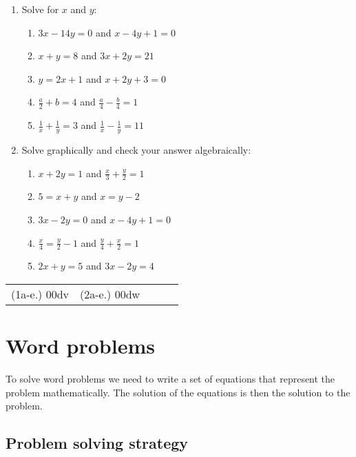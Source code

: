 \begin{exercises}{}
{
\begin{enumerate}[noitemsep, label=\textbf{\arabic*}. ] 
\item Solve for $x$ and $y$: 
\begin{enumerate}[noitemsep, label=\textbf{(\alph*)} ] 
\item $3x-14y=0$ and $x-4y+1=0$
\item $x+y=8$ and $3x + 2y = 21$
\item $y=2x+1$ and $x + 2y + 3 = 0$
\item $\frac{a}{2}+b=4$ and $\frac{a}{4} -\frac{b}{4}=1$
\item $\frac{1}{x}+\frac{1}{y}=3$ and $\frac{1}{x}-\frac{1}{y}=11$
\end{enumerate}

\item Solve graphically and check your answer algebraically:
\begin{enumerate}[noitemsep, label=\textbf{(\alph*)} ] 
\item  $x+2y=1$ and $\frac{x}{3} + \frac{y}{2} = 1$
\item $5= x+y$ and $x = y-2$
\item $3x - 2y = 0$ and $x - 4y + 1 = 0$
\item $\frac{x}{4}=\frac{y}{2}-1$  and $\frac{y}{4}+\frac{x}{2}=1$
\item $2x+y=5$ and $3x-2y=4$
\end{enumerate}
\end{enumerate}
\practiceinfo
\par 
\par \begin{tabular}[h]{ccccc}
(1a-e.) 00dv&  (2a-e.) 00dw & \end{tabular}
}
\end{exercises}

\section{Word problems}

To solve word problems we need to write a set of equations that represent the problem mathematically. 
The solution of the equations is then the solution to the problem.

\subsection*{Problem solving strategy}

